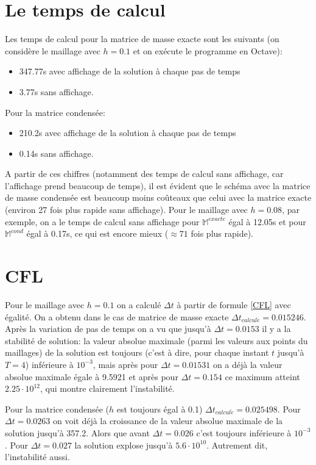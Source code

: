 \documentclass[12pt]{article}
\begin{document}
\section{Le temps de calcul}
Les temps de calcul pour la matrice de masse exacte sont les suivants (on considère le maillage avec $h=0.1$ et on exécute le programme en Octave):
\begin{itemize} 
	\item  347.77s avec affichage de la solution à chaque pas de temps
	\item  3.77s sans affichage.
\end{itemize}
Pour la matrice condensée:
\begin{itemize} 
	\item  210.2s avec affichage de la solution à chaque pas de temps
	\item  0.14s sans affichage.
\end{itemize}
A partir de ces chiffres (notamment des temps de calcul sans affichage, car l'affichage prend beaucoup de temps), il est évident que le schéma avec la matrice de masse condensée est beaucoup moins coûteaux que celui avec la matrice exacte (environ 27 fois plus rapide sans affichage). Pour le maillage avec $h=0.08$, par exemple, on a le temps de calcul sans affichage pour $\mathbb{M}^{exacte}$ égal à 12.05s et pour $\mathbb{M}^{cond}$ égal à 0.17s, ce qui est encore mieux ($\approx 71$ fois plus rapide).

\section{CFL}
Pour le maillage avec $h=0.1$ on a calculé $\Delta t$ à partir de formule \eqref{CFL} avec égalité. On a obtenu dans le cas de matrice de masse exacte $\Delta t_{calcul\acute{e}} = 0.015246$. Après la variation de pas de temps on a vu que jusqu'à $\Delta t = 0.0153$ il y a la stabilité de solution: la valeur absolue maximale (parmi les valeurs aux points du maillages) de la solution est toujours (c'est à dire, pour chaque instant $t$ jusqu'à $T=4$) inférieure à $10^{-3}$, mais après pour $\Delta t = 0.01531$ on a déjà la valeur absolue maximale égale à 9.5921 et après pour $\Delta t = 0.154$ ce maximum atteint $2.25 \cdot 10^{12}$, qui montre clairement l'instabilité.

Pour la matrice condensée ($h$ est toujours égal à 0.1) $\Delta t_{calcul\acute{e}} = 0.025498$. Pour $\Delta t = 0.0263$ on voit déjà la croissance de la valeur absolue maximale de la solution jusqu'à 357.2. Alors que avant $\Delta t = 0.026$ c'est toujours inférieure à $10^{-3}$. Pour $\Delta t = 0.027$ la solution explose jusqu'à $5.6 \cdot 10^{10}$. Autrement dit, l'instabilité aussi.
\end{document}
